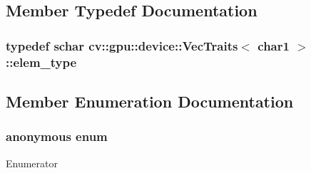 \subsection{Member Typedef Documentation}
\hypertarget{structcv_1_1gpu_1_1device_1_1VecTraits_3_01char1_01_4_acc55ad88a58e04035dc9dfe82e34d2ff}{
\subsubsection[{elem\-\_\-type}]{\setlength{\rightskip}{0pt plus 5cm}typedef {\bf schar} {\bf cv\-::gpu\-::device\-::\-Vec\-Traits}$<$ char1 $>$\-::{\bf elem\-\_\-type}}}\label{structcv_1_1gpu_1_1device_1_1VecTraits_3_01char1_01_4_acc55ad88a58e04035dc9dfe82e34d2ff}


\subsection{Member Enumeration Documentation}
\hypertarget{structcv_1_1gpu_1_1device_1_1VecTraits_3_01char1_01_4_aaa51b3dabf11c3516123d4d244d76e5c}{\subsubsection[{anonymous enum}]{\setlength{\rightskip}{0pt plus 5cm}anonymous enum}}\label{structcv_1_1gpu_1_1device_1_1VecTraits_3_01char1_01_4_aaa51b3dabf11c3516123d4d244d76e5c}
\begin{Desc}
\item[Enumerator]\par
\begin{description}
\item[{\em 
\hypertarget{structcv_1_1gpu_1_1device_1_1VecTraits_3_01char1_01_4_aaa51b3dabf11c3516123d4d244d76e5ca87e3b292931989e627ad22b2233b7ead}{cn}\label{structcv_1_1gpu_1_1device_1_1VecTraits_3_01char1_01_4_aaa51b3dabf11c3516123d4d244d76e5ca87e3b292931989e627ad22b2233b7ead}
}]\end{description}
\end{Desc}


